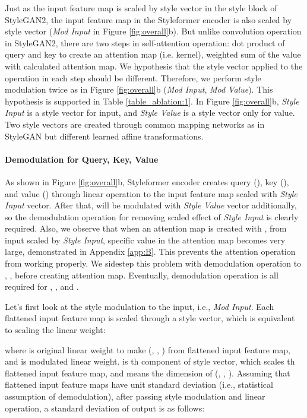 \documentclass[10pt,twocolumn,letterpaper]{article}
\begin{document}
Just as the input feature map is scaled by style vector in the style block of StyleGAN2, the input feature map in the Styleformer encoder is also scaled by style vector (\textit{Mod Input} in Figure \ref{fig:overall}b).
But unlike convolution operation in StyleGAN2, there are two steps in self-attention operation: dot product of query and key to create an attention map (i.e. kernel), weighted sum of the value with calculated attention map.
We hypothesis that the style vector applied to the operation in each step should be different. 
Therefore, we perform style modulation twice as in Figure \ref{fig:overall}b (\textit{Mod Input}, \textit{Mod Value}). This hypothesis is supported in Table \ref{table_ablation:1}. 
In Figure \ref{fig:overall}b,  \textit{Style Input} is a style vector for input, and \textit{Style Value} is a style vector only for value. Two style vectors are created through common mapping networks as in StyleGAN but different learned affine transformations. 

\paragraph{Demodulation for Query, Key, Value} 
As shown in Figure \ref{fig:overall}b, Styleformer encoder creates query (), key (), and value () through linear operation to the input feature map scaled with \textit{Style Input} vector. After that,  will be modulated with \textit{Style Value} vector additionally, so the demodulation operation for removing scaled effect of \textit{Style Input} is clearly required. Also, we observe that when an attention map is created with ,  from input scaled by \textit{Style Input}, specific value in the attention map becomes very large, demonstrated in Appendix \ref{app:B}. This prevents the attention operation from working properly. We sidestep this problem with demodulation operation to , , before creating attention map. Eventually, demodulation operation is all required for , , and .

Let's first look at the style modulation to the input, i.e., \textit{Mod Input}. Each flattened input feature map is scaled through a style vector, which is equivalent to scaling the linear weight:

where  is original linear weight to make (, , ) from flattened input feature map, and  is modulated linear weight.  is th component of style vector, which scales th flattened input feature map, and  means the dimension of (, , ). Assuming that flattened input feature maps have unit standard deviation (i.e., statistical assumption of demodulation), after passing style modulation and linear operation, a standard deviation of output is as follows:
\end{document}
